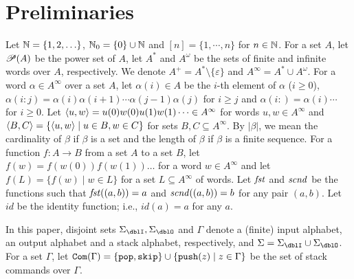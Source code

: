 \section{Preliminaries}
Let $\mathbb{N}=\{1,2,\ldots\}$, $\mathbb{N}_0=\{0\} \cup \mathbb{N}$ and $[n]=\{1,\cdots,n\}$ for $n\in\mathbb{N}$.
For a set $A$, let $\mathscr{P}(A)$ be the power set of $A$,
let $A^*$ and $A^\omega$ be the sets of finite and infinite words over $A$, respectively.
We denote $A^+ = A^*\setminus\{\varepsilon\}$ and
$A^\infty = A^* \cup A^\omega$.
For a word $\alpha\in A^\infty$ over a set $A$,
let $\alpha(i)\in A$ be the $i$-th element of $\alpha$ ($i\geq 0$),
$\alpha(i:j)=\alpha(i)\alpha(i+1)\cdots\alpha(j-1)\alpha(j)$ for $i\geq j$
and $\alpha(i:)=\alpha(i)\cdots$ for $i\geq 0$.
Let $\langle u, w\rangle = u(0)w(0)u(1)w(1)\cdots \in A^\infty$ for words $u,w\in A^\infty$ and $\langle B, C\rangle = \{\langle u, w\rangle\mid u\in B, w\in C\}$ for sets $B, C\subseteq A^\infty$.
By $|\beta|$, we mean the cardinality of $\beta$ if $\beta$ is a set
and the length of $\beta$ if $\beta$ is a finite sequence.
For a function $f:A\to B$ from a set $A$ to a set $B$,
let $f(w)=f(w(0))f(w(1))\ldots$ for a word $w\in A^{\infty}$
and let $f(L)=\{f(w)\mid w\in L\}$ for a set $L\subseteq A^{\infty}$
of words.
Let $\mathit{fst}$ and $\mathit{scnd}$ be the functions such that $\mathit{fst}((a,b))=a$ and $\mathit{scnd}((a,b))=b$ for any pair $(a,b)$.
Let $\mathit{id}$ be the identity function; i.e.,
$\mathit{id}(a)=a$ for any $a$.

In this paper, disjoint sets $\Sigma_\dblI, \Sigma_\dblO$ and $\Gamma$ denote
a (finite) input alphabet, an output alphabet and a stack alphabet, respectively,
and $\Sigma = \Sigma_\dblI \cup \Sigma_\dblO$.
For a set $\Gamma$, let $\mathtt{Com}(\Gamma) = \{\mathtt{pop},\mathtt{skip}\}\cup\{\mathtt{push}(z)\mid z\in \Gamma\}$ be the set of stack commands over $\Gamma$.

